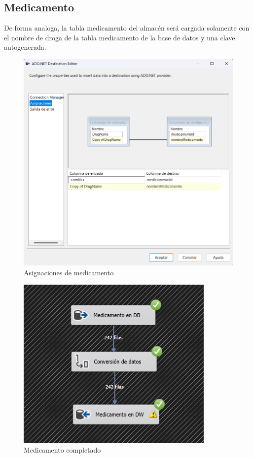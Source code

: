 \documentclass{article}
\begin{document}
	\subsection{Medicamento}
	De forma analoga, la tabla medicamento del almacén será cargada solamente con el nombre de droga de la tabla medicamento  de la base de datos y una clave autogenerada.
	\begin{figure}[H]
		\centering
		\includegraphics[width=.7\linewidth]{./images/asignaciones/medicamento.png}
		\caption{Asignaciones de medicamento}
	\end{figure}
	
	\begin{figure}[H]
		\centering
		\includegraphics[width=.3\linewidth]{./images/completados/medicamento.png}
		\caption{Medicamento completado}
	\end{figure}
\end{document}
